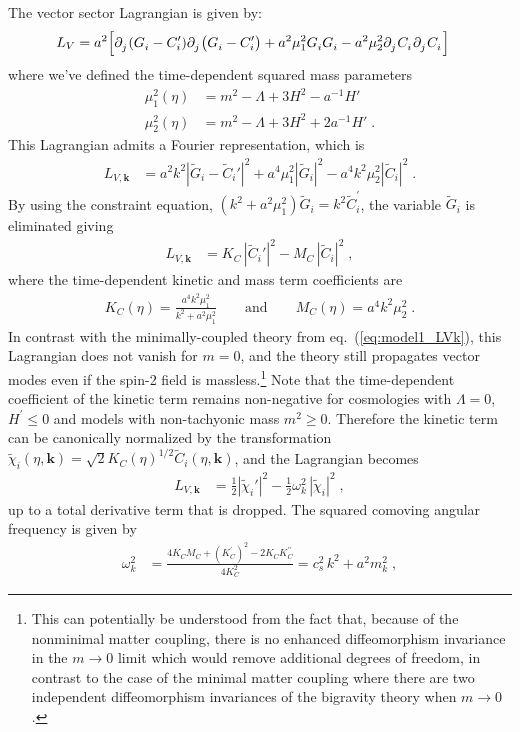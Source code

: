 \documentclass[11pt,a4paper]{article}
\newcommand{\ba}[1]{\begin{align} #1 \end{align}}
\newcommand{\bes}[1]{\begin{equation}\begin{split} #1 \end{split}\end{equation}}
\newcommand{\bsa}[2]{\begin{subequations}\label{#1}\begin{align} #2 \end{align}\end{subequations}}
\newcommand{\kvec}{{\bm k}}
\newcommand{\LV}{L_V}
\newcommand{\LVk}{L_{V,\kvec}}
\newcommand{\eref}[1]{eq.~(\ref{#1})}
\begin{document}
The vector sector Lagrangian is given by:
\ba{\label{eq:model2_LV}
    \LV &= a^2 \Big[ 
    \partial\indices{_j}(G\indices{_i} - C_i') \partial\indices{_j} \bigl( G\indices{_i} - C_i' \bigr) 
    + a^2 \mu_1^2 G\indices{_i} G\indices{_i} 
    - a^2 \mu_2^2 \partial\indices{_j}C\indices{_i}\partial\indices{_j}C\indices{_i} 
    \Big] 
}
where we've defined the time-dependent squared mass parameters 
\bsa{}{
    \mu_1^2(\eta) & = m^2 - \Lambda + 3 H^2 - a^{-1}H' \\ 
    \mu_2^2(\eta) & = m^2 - \Lambda + 3 H^2 + 2 a^{-1} H' 
    \;.
}
This Lagrangian admits a Fourier representation, which is 
\bes{
    \LVk &= 
    a^2 k^2 | \tilde{G}_i - \tilde{C}_i' |^2 
    + a^4 \mu_1^2 | \tilde{G}_i |^2 
    - a^4 k^2 \mu_2^2 | \tilde{C}_i |^2 
    \;.
}
By using the constraint equation, $(k^2 + a^2 \mu_1^2) \tilde{G}_i = k^2 \tilde{C}_i^\prime$, the variable $\tilde{G}_i$ is eliminated giving 
\ba{\label{eq:model2_LVk}
    \LVk &= K_C \, |\tilde{C}_i'|^2 - M_C \,|\tilde{C}_i|^2 
    \;,
}
where the time-dependent kinetic and mass term coefficients are 
\ba{\label{eq:KC_MC_def}
    K_C(\eta) = \frac{a^4 k^2 \mu_1^2}{k^2 + a^2 \mu_1^2} 
    \qquad \text{and} \qquad 
    M_C(\eta) = a^4 k^2 \mu_2^2 
    \;.
}
In contrast with the minimally-coupled theory from \eref{eq:model1_LVk}, this Lagrangian does not vanish for $m=0$, and the theory still propagates vector modes even if the spin-2 field is massless.\footnote{This can potentially be understood from the fact that, because of the nonminimal matter coupling, there is no enhanced diffeomorphism invariance in the $m\rightarrow 0$ limit which would remove additional degrees of freedom, in contrast to the case of the minimal matter coupling where there are two independent diffeomorphism invariances of the bigravity theory when $m\rightarrow 0$.}  Note that the time-dependent coefficient of the kinetic term remains non-negative for cosmologies with $\Lambda = 0$, $H^\prime \leq 0$ and models with non-tachyonic mass $m^2 \geq 0$.  Therefore the kinetic term can be canonically normalized by the transformation $\tilde{\chi}_i(\eta,\kvec) = \sqrt{2} K_C(\eta)^{1/2} \tilde{C}_i(\eta,\kvec)$, and the Lagrangian becomes 
\ba{\label{eq:fouriervector}
    \LVk & = 
    \frac{1}{2} |\tilde{\chi}_i'|^2 
    - \frac{1}{2} \omega_k^2 \,|\tilde{\chi}_i|^2 
    \;,
}
up to a total derivative term that is dropped.  The squared comoving angular frequency is given by 
\bes{\label{model1_vector_omegaksq}
    \omega_k^2 
    & = \frac{4 K_C M_C + (K_C^\prime)^2 - 2 K_C K_C^{\prime\prime}}{4 K_C^2} 
    = c_s^2 \, k^2 + a^2 m_k^2
    \;,
}
\end{document}
